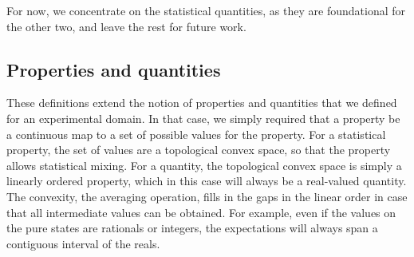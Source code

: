 For now, we concentrate on the statistical quantities, as they are foundational for the other two, and leave the rest for future work.

\subsection{Properties and quantities}

These definitions extend the notion of properties and quantities that we defined for an experimental domain. In that case, we simply required that a property be a continuous map to a set of possible values for the property. For a statistical property, the set of values are a topological convex space, so that the property allows statistical mixing. For a quantity, the topological convex space is simply a linearly ordered property, which in this case will always be a real-valued quantity. The convexity, the averaging operation, fills in the gaps in the linear order in case that all intermediate values can be obtained. For example, even if the values on the pure states are rationals or integers, the expectations will always span a contiguous interval of the reals.

